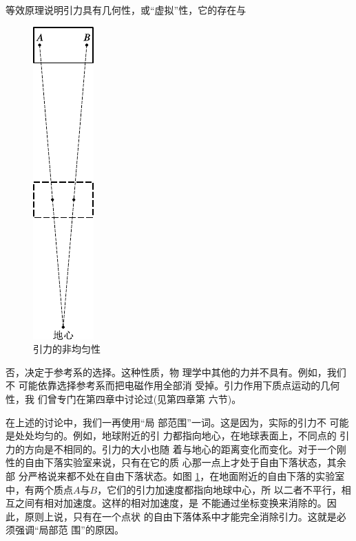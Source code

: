 等效原理说明引力具有几何性，或“虚拟”性，它的存在与
\begin{figure}
    \centering
    \includegraphics{figure/fig12.13}
    \caption{引力的非均匀性}
    \label{fig:12.13}
\end{figure}
否，决定于参考系的选择。这种性质，物
理学中其他的力并不具有。例如，我们不
可能依靠选择参考系而把电磁作用全部消
受掉。引力作用下质点运动的几何性，我
们曾专门在第四章中讨论过(见第四章第
六节)。

在上述的讨论中，我们一再使用“局
部范围”一词。这是因为，实际的引力不
可能是处处均匀的。例如，地球附近的引
力都指向地心，在地球表面上，不同点的
引力的方向是不相同的。引力的大小也随
着与地心的距离变化而变化。对于一个刚
性的自由下落实验室来说，只有在它的质
心那一点上才处于自由下落状态，其余部
分严格说来都不处在自由下落状态。如图
\ref{fig:12.13}，在地面附近的自由下落的实验室
中，有两个质点$ A $与$ B $，它们的引力加速度都指向地球中心，所
以二者不平行，相互之间有相对加速度。这样的相对加速度，是
不能通过坐标变换来消除的。因此，原则上说，只有在一个点状
的自由下落体系中才能完全消除引力。这就是必须强调“局部范
围”的原因。
